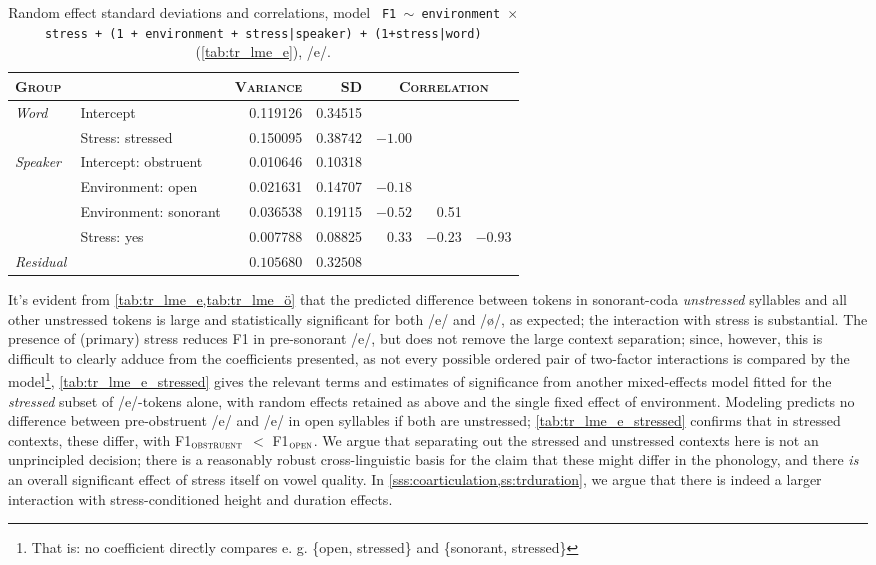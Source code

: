 \begin{table}[H]
  \centering\small
  \begin{tabular}{llrrrrr}
    \toprule
    \textsc{Group} & \textsc{} & \textsc{Variance} & \textsc{SD} & \multicolumn{3}{c}{\textsc{Correlation}}\\
    \midrule
    \multirow{2}{*}{\textit{Word}} & Intercept & 0.119126 & 0.34515  \\
                & Stress: stressed & 0.150095 & 0.38742 & $-1.00$  \\
    \midrule
    \multirow{4}{*}{\textit{Speaker}} & Intercept: obstruent & 0.010646 & 0.10318  \\
                & Environment: open                        & 0.021631 & 0.14707   & $-0.18$  \\
                & Environment: sonorant                    & 0.036538 & 0.19115  & $-0.52$ &  0.51    \\
                & Stress: yes                              & 0.007788 & 0.08825  & 0.33    & $-0.23$ &$-0.93$ \\
    \midrule
    \textit{Residual} & & $0.105680$ & $0.32508$ \\
    \bottomrule
  \end{tabular}
  \caption[\texttt{\footnotesize F1 $\sim$ environment$\times$stress + (1 + environment + stress|speaker) + (1|word)}, /e/]{Random effect standard deviations and correlations, model \texttt{ F1 $\sim$ environment $\times$ stress + (1 + environment + stress|speaker) + (1+stress|word)} (\cref{tab:tr_lme_e}), /e/.}
  \label{tab:tr_lme_e_random}
\end{table}

It's evident from \cref{tab:tr_lme_e,tab:tr_lme_ö} that the predicted difference between tokens in sonorant-coda \emph{unstressed} syllables and all other unstressed tokens is large and statistically significant for both /e/ and /\o/, as expected; the interaction with stress is substantial. The presence of (primary) stress reduces F1 in pre-sonorant /e/, but does not remove the large context separation; since, however, this is difficult to clearly adduce from the coefficients presented, as not every possible ordered pair of two-factor interactions is compared by the model\footnote{That is: no coefficient directly compares e. g. \{open, stressed\} and \{sonorant, stressed\}}, \cref{tab:tr_lme_e_stressed} gives the relevant terms and estimates of significance from another mixed-effects model fitted for the \emph{stressed} subset of /e/-tokens alone, with random effects retained as above and the single fixed effect of environment. Modeling predicts no difference between pre-obstruent /e/ and /e/ in open syllables if both are unstressed; \cref{tab:tr_lme_e_stressed} confirms that in stressed contexts, these differ, with F1$_\textsc{obstruent}$ $<$ F1$_\textsc{open}$. We argue that separating out the stressed and unstressed contexts here is not an unprincipled decision; there is a reasonably robust cross-linguistic basis for the claim that these might differ in the phonology, and there \emph{is} an overall significant effect of stress itself on vowel quality. In \cref{sss:coarticulation,ss:trduration}, we argue that there is indeed a larger interaction with stress-conditioned height and duration effects.

